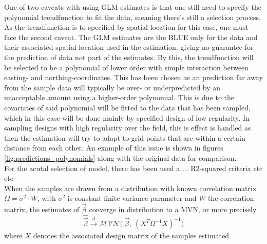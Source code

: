 \documentclass{report}
\begin{document}
One of two caveats with using GLM estimates is that one still need to specify the polynomial trendfunction to fit the data, meaning there's still a selection process. As the trendfunction is to specified by spatial location for this case, one must face the second caveat. The GLM estimates are the BLUE only for the data and their associated spatial location used in the estimation, giving no guarantee for the prediction of data not part of the estimates. By this, the trendfunction will be selected to be a polynomial of lower order with simple interaction between easting- and northing-coordinates. This has been chosen as an prediction far away from the sample data will typically be over- or underpredicted by an unacceptable amount using a higher-order polynomial. This is due to the covariates of said polynomial will be fitted to the data that has been sampled, which in this case will be done mainly by specified design of low regularity. In sampling designs with high regularity over the field, this is effect is handled as then the estimation will try to adapt to grid points that are within a certain distance from each other. An example of this issue is shown in figures \ref{fig:predictions_polynomials} along with the original data for comparison.  \\

For the acutal selection of model, there has been used a ... R2-squared criteria etc etc \\

When the samples are drawn from a distribution with known correlation matrix $\Omega = \sigma^2 \cdot W$, with $\sigma^2$ is constant finite variance parameter and $W$ the correlation matrix, the estimates of $\vec{\beta}$ converge in distribution to a MVN, or more precisely
\begin{equation}
\hat{\vec{\beta}} \xrightarrow[]{d} \mathcal{MVN} \big( \ \vec{\beta}, \ (X^T \Omega^{-1} X)^{-1} \big)
\end{equation}
where $X$ denotes the associated design matrix of the samples estimated.
\end{document}
